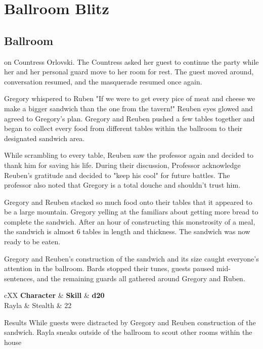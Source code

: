 \chapter{Ballroom Blitz}
\section{Ballroom}

 on Countress Orlovski. The Countress asked her guest to continue the party while her and her personal guard move to her room for rest. The guest moved around, conversation resumed, and the masquerade resumed once again.

Gregory whispered to Ruben "If we were to get every pice of meat and cheese we make a bigger sandwich than the one from the tavern!" Reuben eyes glowed and agreed to Gregory's plan. Gregory and Reuben pushed a few tables together and began to collect every food from different tables within the ballroom to their designated sandwich area.

While scrambling to every table, Reuben saw the professor again and decided to thank him for saving his life. During their discussion, Professor acknowledge Reuben's gratitude and decided to "keep his cool" for future battles. The professor also noted that Gregory is a total douche and shouldn't trust him.

Gregory and Reuben stacked so much food onto their tables that it appeared to be a large mountain. Gregory yelling at the familiars about getting more bread to complete the sandwich. After an hour of constructing this monstrosity of a meal, the sandwich is almost 6 tables in length and thickness. The sandwich was now ready to be eaten.

Gregory and Reuben's construction of the sandwich and its size caught everyone's attention in the ballroom. Bards stopped their tunes, guests paused mid-sentences, and the remaining guards all gathered around Gregory and Ruben. 

\begin{DndTable}[color=PhbLightCyan]{cXX}
	\textbf{Character} & \textbf{Skill} & \textbf{d20} \\
	Rayla & Stealth  & 22 \\
\end{DndTable}

\begin{DndComment}{Results}
	While guests were distracted by Gregory and Reuben construction of the sandwich. Rayla sneaks outside of the ballroom to scout other rooms within the house
\end{DndComment}


